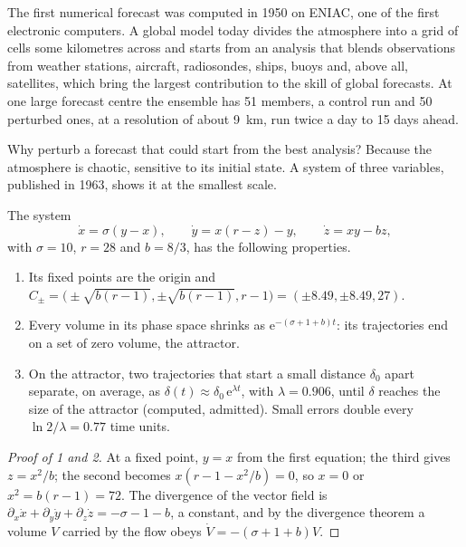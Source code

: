 The first numerical forecast was computed in 1950 on ENIAC, one of the first electronic
computers. A global model today divides the atmosphere into a grid of cells some kilometres
across and starts from an analysis that blends observations from weather stations, aircraft,
radiosondes, ships, buoys and, above all, satellites, which bring the largest contribution to the
skill of global forecasts. At one large forecast centre the ensemble
has 51 members, a control run and 50 perturbed ones, at a resolution of about \qty{9}{km}, run
twice a day to 15 days ahead.

Why perturb a forecast that could start from the best analysis? Because the atmosphere is
chaotic, sensitive to its initial state. A system of three variables, published in 1963, shows it
at the smallest scale.

\begin{proposition}\label{prop:b2:weather-systems:lorenz}
The system
\[
  \dot x = \sigma(y - x), \qquad \dot y = x(r - z) - y, \qquad \dot z = xy - bz,
\]
with $\sigma = 10$, $r = 28$ and $b = 8/3$, has the following properties.
\begin{enumerate}
  \item Its fixed points are the origin and $C_\pm = \bigl(\pm\sqrt{b(r - 1)}, \pm\sqrt{b(r - 1)},
        r - 1\bigr) = (\pm 8.49, \pm 8.49, 27)$.
  \item Every volume in its phase space shrinks as $\mathrm{e}^{-(\sigma + 1 + b)t}$: its
        trajectories end on a set of zero volume, the attractor.
  \item On the attractor, two trajectories that start a small distance $\delta_0$ apart separate,
        on average, as $\delta(t) \approx \delta_0\,\mathrm{e}^{\lambda t}$, with $\lambda =
        0.906$, until $\delta$ reaches the size of the attractor (computed, admitted). Small
        errors double every $\ln 2/\lambda = 0.77$ time units.
\end{enumerate}
\end{proposition}

\begin{proof}[Proof of 1 and 2]
At a fixed point, $y = x$ from the first equation; the third gives $z = x^2/b$; the second
becomes $x(r - 1 - x^2/b) = 0$, so $x = 0$ or $x^2 = b(r - 1) = 72$. The divergence of the
vector field is $\partial_x\dot x + \partial_y\dot y + \partial_z\dot z = -\sigma - 1 - b$, a
constant, and by the divergence theorem a volume $V$ carried by the flow obeys $\dot V =
-(\sigma + 1 + b)V$.
\end{proof}

